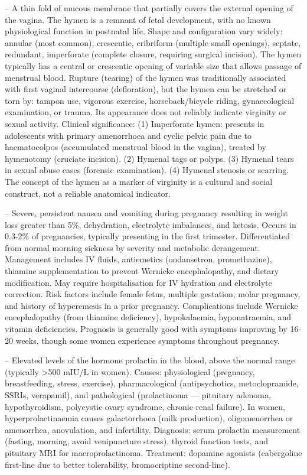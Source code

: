 -- A thin fold of mucous membrane that partially covers the external opening of the vagina. The hymen is a remnant of fetal development, with no known physiological function in postnatal life. Shape and configuration vary widely: annular (most common), crescentic, cribriform (multiple small openings), septate, redundant, imperforate (complete closure, requiring surgical incision). The hymen typically has a central or crescentic opening of variable size that allows passage of menstrual blood. Rupture (tearing) of the hymen was traditionally associated with first vaginal intercourse (defloration), but the hymen can be stretched or torn by: tampon use, vigorous exercise, horseback/bicycle riding, gynaecological examination, or trauma. Its appearance does not reliably indicate virginity or sexual activity. Clinical significance: (1) Imperforate hymen: presents in adolescents with primary amenorrhoea and cyclic pelvic pain due to haematocolpos (accumulated menstrual blood in the vagina), treated by hymenotomy (cruciate incision). (2) Hymenal tags or polyps. (3) Hymenal tears in sexual abuse cases (forensic examination). (4) Hymenal stenosis or scarring. The concept of the hymen as a marker of virginity is a cultural and social construct, not a reliable anatomical indicator.

-- Severe, persistent nausea and vomiting during pregnancy resulting in weight loss greater than 5\%, dehydration, electrolyte imbalances, and ketosis. Occurs in 0.3-2\% of pregnancies, typically presenting in the first trimester. Differentiated from normal morning sickness by severity and metabolic derangement. Management includes IV fluids, antiemetics (ondansetron, promethazine), thiamine supplementation to prevent Wernicke encephalopathy, and dietary modification. May require hospitalisation for IV hydration and electrolyte correction. Risk factors include female fetus, multiple gestation, molar pregnancy, and history of hyperemesis in a prior pregnancy. Complications include Wernicke encephalopathy (from thiamine deficiency), hypokalaemia, hyponatraemia, and vitamin deficiencies. Prognosis is generally good with symptoms improving by 16-20 weeks, though some women experience symptoms throughout pregnancy.

-- Elevated levels of the hormone prolactin in the blood, above the normal range (typically >500 mIU/L in women). Causes: physiological (pregnancy, breastfeeding, stress, exercise), pharmacological (antipsychotics, metoclopramide, SSRIs, verapamil), and pathological (prolactinoma — pituitary adenoma, hypothyroidism, polycystic ovary syndrome, chronic renal failure). In women, hyperprolactinaemia causes galactorrhoea (milk production), oligomenorrhea or amenorrhea, anovulation, and infertility. Diagnosis: serum prolactin measurement (fasting, morning, avoid venipuncture stress), thyroid function tests, and pituitary MRI for macroprolactinoma. Treatment: dopamine agonists (cabergoline first-line due to better tolerability, bromocriptine second-line).

